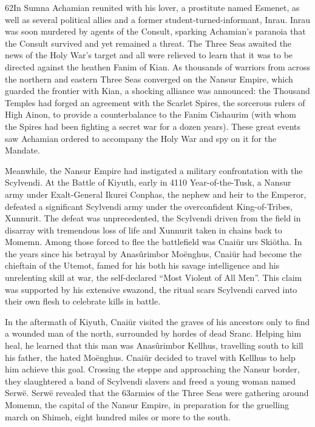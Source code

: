 \documentclass[]{book}
\begin{document}
62In Sumna Achamian reunited with his lover, a prostitute named Esmenet, as well as
several political allies and a former student-turned-informant, Inrau. Inrau was soon
murdered by agents of the Consult, sparking Achamian's paranoia that the Consult
survived and yet remained a threat. The Three Seas awaited the news of the Holy War's
target and all were relieved to learn that it was to be directed against the heathen Fanim
of Kian. As thousands of warriors from across the northern and eastern Three Seas
converged on the Nansur Empire, which guarded the frontier with Kian, a shocking
alliance was announced: the Thousand Temples had forged an agreement with the
Scarlet Spires, the sorcerous rulers of High Ainon, to provide a counterbalance to the
Fanim Cishaurim (with whom the Spires had been fighting a secret war for a dozen
years). These great events saw Achamian ordered to accompany the Holy War and spy
on it for the Mandate.

Meanwhile, the Nansur Empire had instigated a military confrontation with the
Scylvendi. At the Battle of Kiyuth, early in 4110 Year-of-the-Tusk, a Nansur army under
Exalt-General Ikurei Conphas, the nephew and heir to the Emperor, defeated a
significant Scylvendi army under the overconfident King-of-Tribes, Xunnurit. The
defeat was unprecedented, the Scylvendi driven from the field in disarray with
tremendous loss of life and Xunnurit taken in chains back to Momemn. Among those
forced to flee the battlefield was Cnaiür urs Skiötha. In the years since his betrayal by
Anasûrimbor Moënghus, Cnaiür had become the chieftain of the Utemot, famed for
his both his savage intelligence and his unrelenting skill at war, the self-declared ``Most
Violent of All Men''. This claim was supported by his extensive swazond, the ritual scars
Scylvendi carved into their own flesh to celebrate kills in battle.

In the aftermath of Kiyuth, Cnaiür visited the graves of his ancestors only to find a
wounded man of the north, surrounded by hordes of dead Sranc. Helping him heal, he
learned that this man was Anasûrimbor Kellhus, travelling south to kill his father, the
hated Moënghus. Cnaiür decided to travel with Kellhus to help him achieve this goal.
Crossing the steppe and approaching the Nansur border, they slaughtered a band of
Scylvendi slavers and freed a young woman named Serwë. Serwë revealed that the
63armies of the Three Seas were gathering around Momemn, the capital of the Nansur
Empire, in preparation for the gruelling march on Shimeh, eight hundred miles or
more to the south.
\end{document}
